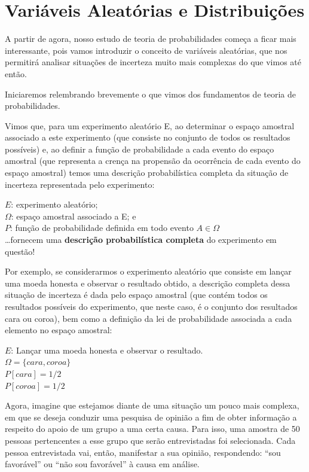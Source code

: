 \documentclass[
]{book}
\theoremstyle{definition}
\theoremstyle{definition}
\theoremstyle{definition}
\theoremstyle{remark}
\begin{document}
\hypertarget{variuxe1veis-aleatuxf3rias-e-distribuiuxe7uxf5es}{%
\chapter{Variáveis Aleatórias e Distribuições}\label{variuxe1veis-aleatuxf3rias-e-distribuiuxe7uxf5es}}

A partir de agora, nosso estudo de teoria de probabilidades começa a ficar mais interessante, pois vamos introduzir o conceito de variáveis aleatórias, que nos permitirá analisar situações de incerteza muito mais complexas do que vimos até então.

Iniciaremos relembrando brevemente o que vimos dos fundamentos de teoria de probabilidades.

Vimos que, para um experimento aleatório E, ao determinar o espaço amostral associado a este experimento (que consiste no conjunto de todos os resultados possíveis) e, ao definir a função de probabilidade a cada evento do espaço amostral (que representa a crença na propensão da ocorrência de cada evento do espaço amostral) temos uma descrição probabilística completa da situação de incerteza representada pelo experimento:

\(E\): experimento aleatório;\\
\(\Omega\): espaço amostral associado a E; e\\
\(P\): função de probabilidade definida em todo evento \(A \in \Omega\)\\
\ldots fornecem uma \textbf{descrição probabilística completa} do experimento em questão!

Por exemplo, se considerarmos o experimento aleatório que consiste em lançar uma moeda honesta e observar o resultado obtido, a descrição completa dessa situação de incerteza é dada pelo espaço amostral (que contém todos os resultados possíveis do experimento, que neste caso, é o conjunto dos resultados cara ou coroa), bem como a definição da lei de probabilidade associada a cada elemento no espaço amostral:

\(E\): Lançar uma moeda honesta e observar o resultado.\\
\(\Omega = \{cara, coroa\}\)\\
\(P[cara] = 1/2\)\\
\(P[coroa] = 1/2\)

Agora, imagine que estejamos diante de uma situação um pouco mais complexa, em que se deseja conduzir uma pesquisa de opinião a fim de obter informação a respeito do apoio de um grupo a uma certa causa. Para isso, uma amostra de 50 pessoas pertencentes a esse grupo que serão entrevistadas foi selecionada. Cada pessoa entrevistada vai, então, manifestar a sua opinião, respondendo: ``sou favorável'' ou ``não sou favorável'' à causa em análise.
\end{document}
